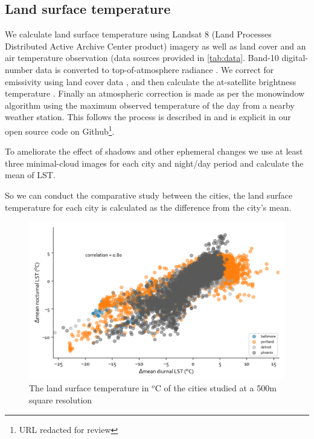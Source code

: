 \documentclass[final,3p,times,twocolumn,sort&compress]{elsarticle}
\begin{document}
\subsection{Land surface temperature}
We calculate land surface temperature using Landsat 8 (Land Processes Distributed Active Archive Center product) imagery as well as land cover and an air temperature observation (data sources provided in \ref{tab:data}. Band-10 digital-number data is converted to top-of-atmosphere radiance \cite{Jimenez-Munoz2003-wc}. We correct for emissivity using land cover data \cite{Alipour2003-gb}, and then calculate the at-satellite brightness temperature \cite{Jimenez-Munoz2003-wc}. Finally an atmospheric correction is made as per the monowindow algorithm \cite{Qin2001-jn} using the maximum observed temperature of the day from a nearby weather station. This follows the process is described in \cite{Scott2016-lc} and is explicit in our open source code on Github\footnote{URL redacted for review}. 

To ameliorate the effect of shadows and other ephemeral changes \cite{Zhou2018-iy} we use at least three minimal-cloud images for each city and night/day period and calculate the mean of LST.

So we can conduct the comparative study between the cities, the land surface temperature for each city is calculated as the difference from the city's mean. 

\begin{figure}
\begin{center}
\includegraphics[width=\linewidth]{fig/report/lst_night-vs-day_500.png}
\caption{The land surface temperature in $^o$C of the cities studied at a 500m square resolution}
\label{fig:scatter_lst}
\end{center}
\end{figure}
\end{document}
